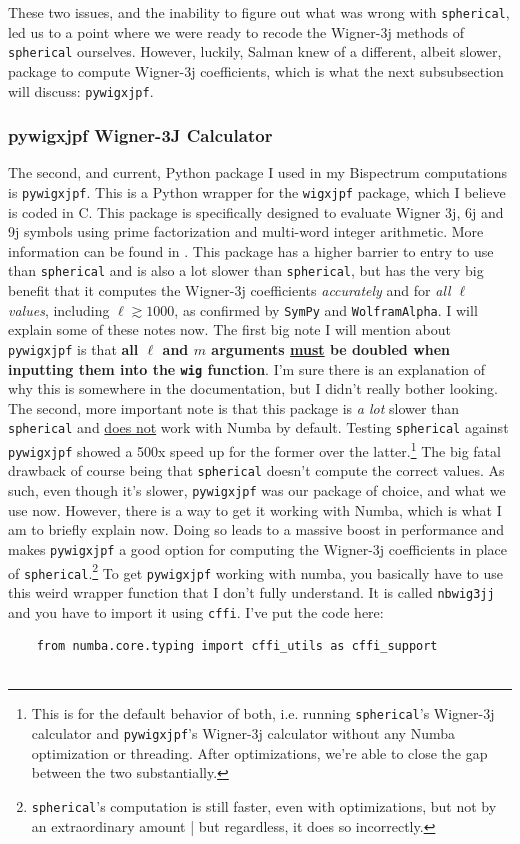 \documentclass[11pt]{article}
\renewcommand{\_}[1]{\underline{ #1 }}
\newcommand{\npar}{\vspace{.3cm}\newline}
\begin{document}
{These two issues, and the inability to figure out what was wrong with \texttt{spherical}, led us to a point where we were ready to recode the Wigner-3j methods of \texttt{spherical} ourselves. However, luckily, Salman knew of a different, albeit slower, package to compute Wigner-3j coefficients, which is what the next subsubsection will discuss: \texttt{pywigxjpf}.

\subsubsection{pywigxjpf Wigner-3J Calculator}\label{pywigxjpf}

The second, and current, Python package I used in my Bispectrum computations is \texttt{pywigxjpf}. This is a Python wrapper for the \texttt{wigxjpf} package, which I believe is coded in C. This package is specifically designed to evaluate Wigner 3j, 6j and 9j symbols using prime factorization and multi-word integer arithmetic. More information can be found in \cite{Johansson_2016}. This package has a higher barrier to entry to use than \texttt{spherical} and is also a lot slower than \texttt{spherical}, but has the very big benefit that it computes the Wigner-3j coefficients \textit{accurately} and for \textit{all $\ell$ values}, including $\ell \gtrsim  1000$, as confirmed by \texttt{SymPy} and \texttt{WolframAlpha}. I will explain some of these notes now.
\npar
The first big note I will mention about \texttt{pywigxjpf} is that \textbf{all $\ell$ and $m$ arguments \underline{must} be doubled when inputting them into the \texttt{wig} function}. I'm sure there is an explanation of why this is somewhere in the documentation, but I didn't really bother looking.
\npar
The second, more important note is that this package is \textit{a lot} slower than \texttt{spherical} and \underline{does not} work with Numba by default. Testing \texttt{spherical} against \texttt{pywigxjpf} showed a 500x speed up for the former over the latter.\footnote{This is for the default behavior of both, i.e. running \texttt{spherical}'s Wigner-3j calculator and \texttt{pywigxjpf}'s Wigner-3j calculator without any Numba optimization or threading. After optimizations, we're able to close the gap between the two substantially.} The big fatal drawback of course being that \texttt{spherical} doesn't compute the correct values. As such, even though it's slower, \texttt{pywigxjpf} was our package of choice, and what we use now. However, there is a way to get it working with Numba, which is what I am to briefly explain now. Doing so leads to a massive boost in performance and makes \texttt{pywigxjpf} a good option for computing the Wigner-3j coefficients in place of \texttt{spherical}.\footnote{\texttt{spherical}'s computation is still faster, even with optimizations, but not by an extraordinary amount | but regardless, it does so incorrectly.}
\npar
To get \texttt{pywigxjpf} working with numba, you basically have to use this weird wrapper function that I don't fully understand. It is called \texttt{nb\textunderscore wig3jj} and you have to import it using \texttt{cffi}. I've put the code here:
\begin{verbatim}
    from numba.core.typing import cffi_utils as cffi_support


\end{verbatim}}
\end{document}

